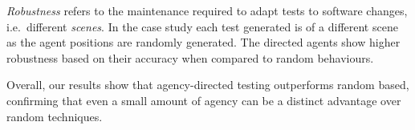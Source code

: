 \documentclass[letterpaper, 10 pt, journal, twoside]{IEEEtran}
\begin{document}
\textit{Robustness} refers to the maintenance required to adapt tests to software changes, i.e.\ different \textit{scenes}. In the case study each test generated is of a different scene as the agent positions are randomly generated. The directed agents show higher robustness based on their accuracy when compared to random behaviours. 





Overall, our results show that agency-directed testing outperforms random based, confirming that even a small amount of agency can be a distinct advantage over random techniques. 
%


\end{document}
